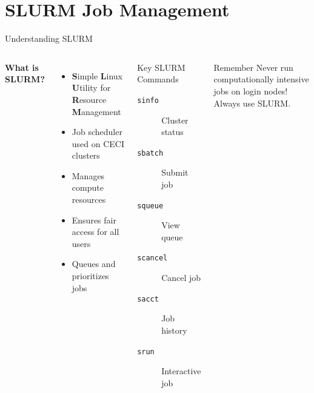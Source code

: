 \documentclass[aspectratio=169]{beamer}
\begin{document}
\section{SLURM Job Management}

\begin{frame}[fragile]{Understanding SLURM}
\begin{columns}[T]
\textbf{What is SLURM?}
\begin{itemize}
    \item \textbf{S}imple \textbf{L}inux \textbf{U}tility for \textbf{R}esource \textbf{M}anagement
    \item Job scheduler used on CECI clusters
    \item Manages compute resources
    \item Ensures fair access for all users
    \item Queues and prioritizes jobs
\end{itemize}



\begin{block}{Key SLURM Commands}
\begin{description}
    \item[\texttt{sinfo}] Cluster status
    \item[\texttt{sbatch}] Submit job
    \item[\texttt{squeue}] View queue
    \item[\texttt{scancel}] Cancel job
    \item[\texttt{sacct}] Job history
    \item[\texttt{srun}] Interactive job
\end{description}
\end{block}

\vspace{0.5em}
\begin{alertblock}{Remember}
Never run computationally intensive jobs on login nodes! Always use SLURM.
\end{alertblock}
\end{columns}
\end{frame}
\end{document}
